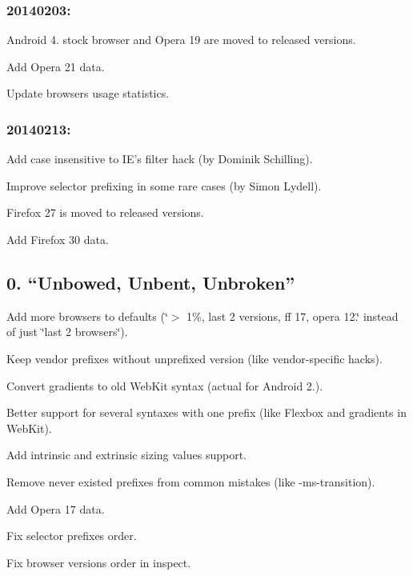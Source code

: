 \subsubsection*{20140203\+:}


\begin{DoxyItemize}
\item Android 4. stock browser and Opera 19 are moved to released versions.
\item Add Opera 21 data.
\item Update browsers usage statistics.
\end{DoxyItemize}

\subsubsection*{20140213\+:}


\begin{DoxyItemize}
\item Add case insensitive to I\+E’s filter hack (by Dominik Schilling).
\item Improve selector prefixing in some rare cases (by Simon Lydell).
\item Firefox 27 is moved to released versions.
\item Add Firefox 30 data.
\end{DoxyItemize}

\subsection*{0. “\+Unbowed, Unbent, Unbroken”}


\begin{DoxyItemize}
\item Add more browsers to defaults (\char`\"{}$>$ 1\%, last 2 versions, ff 17, opera 12.\char`\"{} instead of just \char`\"{}last 2 browsers\char`\"{}).
\item Keep vendor prefixes without unprefixed version (like vendor-\/specific hacks).
\item Convert gradients to old Web\+Kit syntax (actual for Android 2.).
\item Better support for several syntaxes with one prefix (like Flexbox and gradients in Web\+Kit).
\item Add intrinsic and extrinsic sizing values support.
\item Remove never existed prefixes from common mistakes (like -\/ms-\/transition).
\item Add Opera 17 data.
\item Fix selector prefixes order.
\item Fix browser versions order in inspect.
\end{DoxyItemize}

